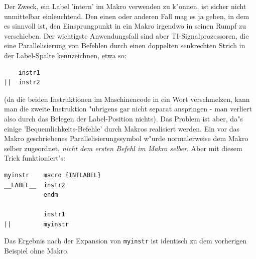\documentclass[12pt,a4paper,twoside]{report}
\begin{document}
Der Zweck, ein Label 'intern' im Makro verwenden zu k"onnen, ist sicher
nicht unmittelbar einleuchtend.  Den einen oder anderen Fall mag es ja
geben, in dem es sinnvoll ist, den Einsprungpunkt in ein Makro irgendwo
in seinen Rumpf zu verschieben.  Der wichtigste Anwendungsfall sind aber
TI-Signalprozessoren, die eine Parallelisierung von Befehlen durch einen
doppelten senkrechten Strich in der Label-Spalte kennzeichnen, etwa so:
\begin{verbatim}
    instr1
||  instr2
\end{verbatim}
(da die beiden Instruktionen im Maschinencode in ein Wort verschmelzen,
kann man die zweite Instruktion "ubrigens gar nicht separat anspringen -
man verliert also durch das Belegen der Label-Position nichts).  Das
Problem ist aber, da"s einige 'Bequemlichkeits-Befehle' durch Makros
realisiert werden.  Ein vor das Makro geschriebenes
Parallelisierungssymbol w"urde normalerweise dem Makro selber zugeordnet,
{\it nicht dem ersten Befehl im Makro selber}.  Aber mit diesem Trick
funktioniert's:
\begin{verbatim}
myinstr    macro {INTLABEL}
__LABEL__  instr2
           endm

           instr1
||         myinstr
\end{verbatim}
Das Ergebnis nach der Expansion von {\tt myinstr} ist identisch zu dem
vorherigen Beispiel ohne Makro.
\end{document}
